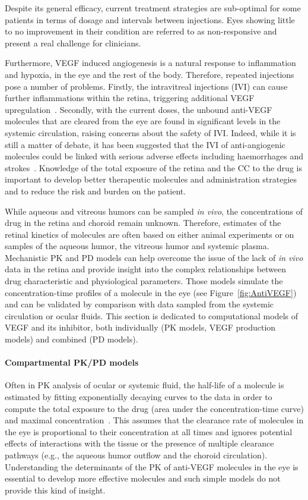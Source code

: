\documentclass{article}
\begin{document}
Despite its general efficacy, current treatment strategies are sub-optimal for some patients in terms of dosage and intervals between injections.
Eyes showing little to no improvement in their condition are referred to as non-responsive and present a real challenge for clinicians.

Furthermore, VEGF induced angiogenesis is a natural response to inflammation and hypoxia, in the eye and the rest of the body. 
Therefore, repeated injections pose a number of problems.
Firstly, the intravitreal injections (IVI) can cause further inflammations within the retina, triggering additional VEGF upregulation~\cite{Iyer_2022}.
Secondly, with the current doses, the unbound anti-VEGF molecules that are cleared from the eye are found in significant levels in the systemic circulation, raising concerns about the safety of IVI.
Indeed, while it is still a matter of debate, it has been suggested that the IVI of anti-angiogenic molecules could be linked with serious adverse effects including haemorrhages and strokes~\cite{Avery_2016, Kaiser_2019, Maloney_2021}.
Knowledge of the total exposure of the retina and the CC to the drug is important to develop better therapeutic molecules and administration strategies and to reduce the risk and burden on the patient.

While aqueous and vitreous humors can be sampled \textit{in vivo}, the concentrations of drug in the retina and choroid remain unknown. 
Therefore, estimates of the retinal kinetics of molecules are often based on either animal experiments or on samples of the aqueous humor, the vitreous humor and systemic plasma.
Mechanistic PK and PD models can help overcome the issue of the lack of \textit{in vivo} data in the retina and provide insight into the complex relationships between drug characteristic and physiological parameters.
Those models simulate the concentration-time profiles of a molecule in the eye (see Figure~\ref{fig:AntiVEGF}) and can be validated by comparison with data sampled from the systemic circulation or ocular fluids.
This section is dedicated to computational models of VEGF and its inhibitor, both individually (PK models, VEGF production models) and combined (PD models).

\paragraph*{Compartmental PK/PD models}

Often in PK analysis of ocular or systemic fluid, the half-life of a molecule is estimated by fitting exponentially decaying curves to the data in order to compute the total exposure to the drug (area under the concentration-time curve) and maximal concentration~\cite{Bakri_2007, Kaiser_2019, Park_2015, Park_2016, Xu_2013}.
This assumes that the clearance rate of molecules in the eye is proportional to their concentration at all times and ignores potential effects of interactions with the tissue or the presence of multiple clearance pathways (e.g., the aqueous humor outflow and the choroid circulation).
Understanding the determinants of the PK of anti-VEGF molecules in the eye is essential to develop more effective molecules and such simple models do not provide this kind of insight.
\end{document}
